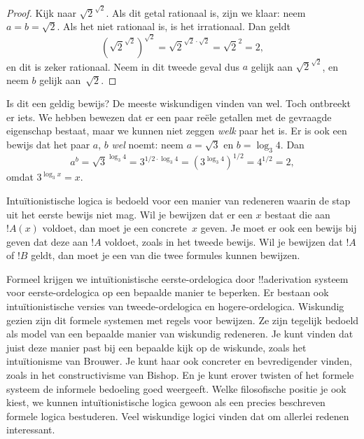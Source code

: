 \documentclass[openany]{memoir}
\begin{document}
\begin{proof}
Kijk naar $\sqrt{2}^{\sqrt{2}}$. Als dit getal rationaal is, zijn we klaar: neem
$a = b = \sqrt{2}$. Als het niet rationaal is, is het irrationaal. Dan geldt
\[
(\sqrt{2}^{\sqrt{2}})^{\sqrt{2}} = \sqrt{2}^{\sqrt{2} \cdot
  \sqrt{2}} = \sqrt{2}^2 = 2,
\]
en dit is zeker rationaal. Neem in dit tweede geval dus $a$ gelijk aan
$\sqrt{2}^{\sqrt{2}}$, en neem $b$ gelijk aan~$\sqrt 2$.
\end{proof}

Is dit een geldig bewijs? De meeste wiskundigen vinden van wel. Toch ontbreekt er
iets. We hebben bewezen dat er een paar reële getallen met de gevraagde
eigenschap bestaat, maar we kunnen niet zeggen \emph{welk} paar het is. Er is ook
een bewijs dat het paar $a$, $b$ \emph{wel} noemt: neem $a = \sqrt{3}$ en
$b = \log_3 4$. Dan
\[
a^b = \sqrt{3}^{\log_3 4} = 3^{1/2 \cdot \log_3 4} = (3^{\log_3
  4})^{1/2} = 4^{1/2}= 2,
\]
omdat $3^{\log_3 x} = x$.

Intuïtionistische logica is bedoeld voor een manier van redeneren waarin de stap
uit het eerste bewijs niet mag. Wil je bewijzen dat er een $x$ bestaat die
aan~$!A(x)$ voldoet, dan moet je een concrete~$x$ geven. Je moet er ook een bewijs
bij geven dat deze aan $!A$ voldoet, zoals in het tweede bewijs. Wil je bewijzen
dat $!A$ of $!B$ geldt, dan moet je een van die twee formules kunnen bewijzen.

Formeel krijgen we intuïtionistische eerste-ordelogica door !!a{derivation}
systeem voor eerste-ordelogica op een bepaalde manier te beperken. Er bestaan
ook intuïtionistische versies van tweede-ordelogica en hogere-ordelogica.
Wiskundig gezien zijn dit formele systemen met regels voor bewijzen. Ze zijn
tegelijk bedoeld als model van een bepaalde manier van wiskundig redeneren. Je
kunt vinden dat juist deze manier past bij een bepaalde kijk op de wiskunde,
zoals het intuïtionisme van Brouwer. Je kunt haar ook concreter en
bevredigender vinden, zoals in het constructivisme van Bishop. En je kunt erover
twisten of het formele systeem de informele bedoeling goed weergeeft. Welke
filosofische positie je ook kiest, we kunnen intuïtionistische logica gewoon als
een precies beschreven formele logica bestuderen. Veel wiskundige logici vinden
dat om allerlei redenen interessant.
\end{document}
